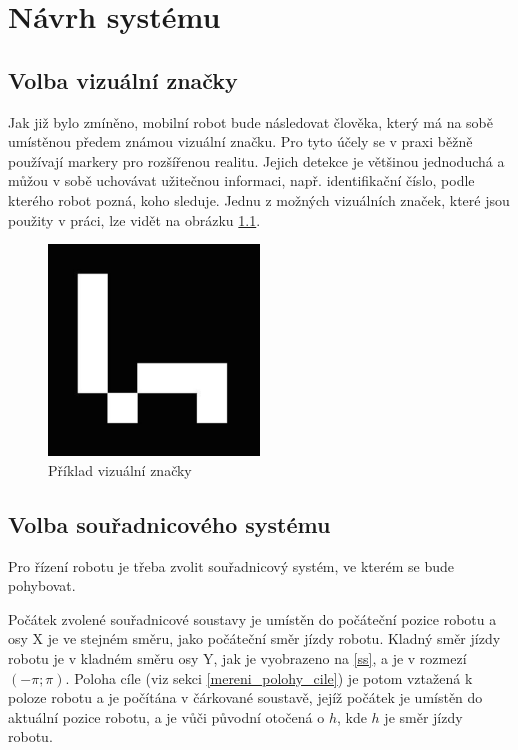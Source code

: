 \documentclass[twoside]{ctuthesis}
\theoremstyle{plain}
\theoremstyle{definition}
\theoremstyle{note}
\begin{document}
\chapter{Návrh systému}
\section{Volba vizuální značky}
Jak již bylo zmíněno, mobilní robot bude následovat člověka, který má na sobě umístěnou předem známou vizuální značku. Pro tyto účely se v praxi běžně používají markery pro rozšířenou realitu. Jejich detekce je většinou jednoduchá a můžou v sobě uchovávat užitečnou informaci, např. identifikační číslo, podle kterého robot pozná, koho sleduje. Jednu z možných vizuálních značek, které jsou použity v práci, lze vidět na obrázku \ref{am}.

\begin{figure}[H]
	\caption{Příklad vizuální značky}
	
	\label{am}
	\includegraphics[width=0.5\textwidth]{images/2/ArucoMarker.jpg}
\end{figure}

\section{Volba souřadnicového systému}
\label{ss_section}

Pro řízení robotu je třeba zvolit souřadnicový systém, ve kterém se bude pohybovat. 

Počátek zvolené souřadnicové soustavy je umístěn do počáteční pozice robotu a osy X je ve stejném směru, jako počáteční směr jízdy robotu. Kladný směr jízdy robotu je v kladném směru osy Y, jak je vyobrazeno na \ref{ss}, a je v rozmezí $\left(-\pi; \pi\right)$. Poloha cíle (viz sekci \ref{mereni_polohy_cile}) je potom vztažená k poloze robotu a je počítána v čárkované soustavě, jejíž počátek je umístěn do aktuální pozice robotu, a je vůči původní otočená o $h$, kde $h$ je směr jízdy robotu.
\end{document}

